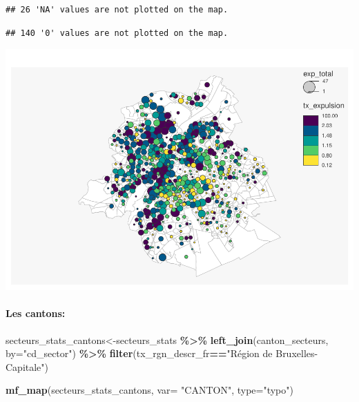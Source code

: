\documentclass[
]{book}
\newenvironment{Shaded}{\begin{snugshade}}{\end{snugshade}}
\newcommand{\AttributeTok}[1]{\textcolor[rgb]{0.13,0.29,0.53}{#1}}
\newcommand{\FunctionTok}[1]{\textcolor[rgb]{0.13,0.29,0.53}{\textbf{#1}}}
\newcommand{\NormalTok}[1]{#1}
\newcommand{\OtherTok}[1]{\textcolor[rgb]{0.56,0.35,0.01}{#1}}
\newcommand{\SpecialCharTok}[1]{\textcolor[rgb]{0.81,0.36,0.00}{\textbf{#1}}}
\newcommand{\StringTok}[1]{\textcolor[rgb]{0.31,0.60,0.02}{#1}}
\begin{document}
\begin{verbatim}
## 26 'NA' values are not plotted on the map.
\end{verbatim}

\begin{verbatim}
## 140 '0' values are not plotted on the map.
\end{verbatim}

\includegraphics{manuel_geo_quanti_files/figure-latex/unnamed-chunk-33-1.pdf}

\hypertarget{les-cantons}{%
\paragraph{Les cantons:}\label{les-cantons}}

\begin{Shaded}
\begin{Highlighting}[]
\NormalTok{secteurs\_stats\_cantons}\OtherTok{\textless{}{-}}\NormalTok{secteurs\_stats }\SpecialCharTok{\%\textgreater{}\%}
  \FunctionTok{left\_join}\NormalTok{(canton\_secteurs, }\AttributeTok{by=}\StringTok{"cd\_sector"}\NormalTok{) }\SpecialCharTok{\%\textgreater{}\%}
  \FunctionTok{filter}\NormalTok{(tx\_rgn\_descr\_fr}\SpecialCharTok{==}\StringTok{"Région de Bruxelles{-}Capitale"}\NormalTok{)}

\FunctionTok{mf\_map}\NormalTok{(secteurs\_stats\_cantons,}
       \AttributeTok{var=} \StringTok{"CANTON"}\NormalTok{,}
       \AttributeTok{type=}\StringTok{"typo"}\NormalTok{)}
\end{Highlighting}
\end{Shaded}
\end{document}
